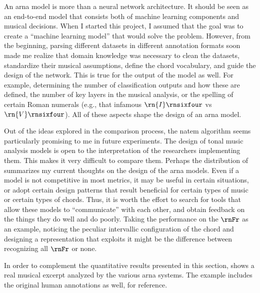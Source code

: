 
An \gls{arna} model is more than a neural network
architecture. It should be seen as an end-to-end model that
consists both of machine learning components and musical
decisions. When I started this project, I assumed that the
goal was to create a ``machine learning model'' that would
solve the problem. However, from the beginning, parsing
different datasets in different annotation formats soon made
me realize that domain knowledge was necessary to clean the
datasets, standardize their musical assumptions, define the
chord vocabulary, and guide the design of the network. This
is true for the output of the model as well. For example,
determining the number of classification outputs and how
these are defined, the number of key layers in the musical
analysis, or the spelling of certain Roman numerals (e.g.,
that infamous $\rn{I}\rnsixfour$ vs $\rn{V}\rnsixfour$). All
of these aspects shape the design of an \gls{arna} model.

Out of the ideas explored in the comparison process, the
\gls{natem} algorithm seems particularly promising to me in
future experiments. The design of tonal music analysis
models is open to the interpretation of the researchers
implementing them. This makes it very difficult to compare
them. Perhaps the distribution of 
summarizes my current thoughts on the design of the
\gls{arna} models. Even if a model is not competitive in
most metrics, it may be useful in certain situations, or
adopt certain design patterns that result beneficial for
certain types of music or certain types of chords. Thus, it
is worth the effort to search for tools that allow these
models to ``communicate'' with each other, and obtain
feedback on the things they do well and do poorly. Taking
the performance on the $\rnFr$ as an example, noticing the
peculiar intervallic configuration of the chord and
designing a representation that exploits it might be the
difference between recognizing all $\rnFr$ or none. 


In order to complement the quantitative results presented in
this section,  shows a real musical
excerpt analyzed by the various \gls{arna} systems. The
example includes the original human annotations as well, for
reference.

